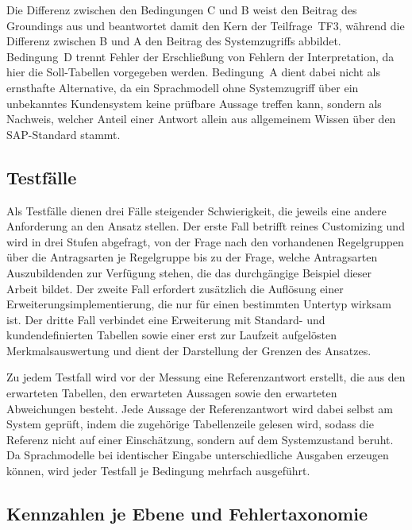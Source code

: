 Die Differenz zwischen den Bedingungen C und B weist den Beitrag des Groundings aus und beantwortet damit den Kern der Teilfrage~TF3, während die Differenz zwischen B und A den Beitrag des Systemzugriffs abbildet. Bedingung~D trennt Fehler der Erschließung von Fehlern der Interpretation, da hier die Soll-Tabellen vorgegeben werden. Bedingung~A dient dabei nicht als ernsthafte Alternative, da ein Sprachmodell ohne Systemzugriff über ein unbekanntes Kundensystem keine prüfbare Aussage treffen kann, sondern als Nachweis, welcher Anteil einer Antwort allein aus allgemeinem Wissen über den SAP-Standard stammt.

\subsection{Testfälle}
\label{subsec:eval-testfaelle}

Als Testfälle dienen drei Fälle steigender Schwierigkeit, die jeweils eine andere Anforderung an den Ansatz stellen. Der erste Fall betrifft reines Customizing und wird in drei Stufen abgefragt, von der Frage nach den vorhandenen Regelgruppen über die Antragsarten je Regelgruppe bis zu der Frage, welche Antragsarten Auszubildenden zur Verfügung stehen, die das durchgängige Beispiel dieser Arbeit bildet. Der zweite Fall erfordert zusätzlich die Auflösung einer Erweiterungsimplementierung, die nur für einen bestimmten Untertyp wirksam ist. Der dritte Fall verbindet eine Erweiterung mit Standard- und kundendefinierten Tabellen sowie einer erst zur Laufzeit aufgelösten Merkmalsauswertung und dient der Darstellung der Grenzen des Ansatzes.

Zu jedem Testfall wird vor der Messung eine Referenzantwort erstellt, die aus den erwarteten Tabellen, den erwarteten Aussagen sowie den erwarteten Abweichungen besteht. Jede Aussage der Referenzantwort wird dabei selbst am System geprüft, indem die zugehörige Tabellenzeile gelesen wird, sodass die Referenz nicht auf einer Einschätzung, sondern auf dem Systemzustand beruht. Da Sprachmodelle bei identischer Eingabe unterschiedliche Ausgaben erzeugen können, wird jeder Testfall je Bedingung mehrfach ausgeführt. %

\subsection{Kennzahlen je Ebene und Fehlertaxonomie}
\label{subsec:eval-metriken}

